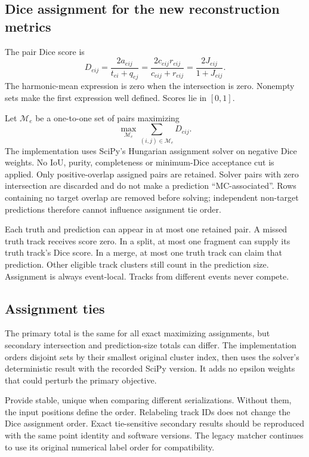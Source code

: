 \documentclass[11pt,letterpaper]{article}
\newcommand{\code}[1]{\texttt{\detokenize{#1}}}
\begin{document}
\subsection{Dice assignment for the new reconstruction metrics}

The pair Dice score is
\begin{equation}
 D_{eij}=\frac{2a_{eij}}{t_{ei}+q_{ej}}
        =\frac{2c_{eij}r_{eij}}{c_{eij}+r_{eij}}
        =\frac{2J_{eij}}{1+J_{eij}}.
\end{equation}
The harmonic-mean expression is zero when the intersection is zero. Nonempty
sets make the first expression well defined. Scores lie in $[0,1]$.

Let $\mathcal M_e$ be a one-to-one set of pairs maximizing
\begin{equation}
 \max_{\mathcal M_e}\sum_{(i,j)\in\mathcal M_e}D_{eij}.
\end{equation}
The implementation uses SciPy's Hungarian assignment solver on negative Dice
weights. No IoU, purity, completeness or minimum-Dice acceptance cut is applied.
Only positive-overlap assigned pairs are retained. Solver pairs with zero
intersection are discarded and do not make a prediction ``MC-associated''.
Rows containing no target overlap are removed before solving; independent
non-target predictions therefore cannot influence assignment tie order.

Each truth and prediction can appear in at most one retained pair. A missed
truth track receives score zero. In a split, at most one fragment can supply its
truth track's Dice score. In a merge, at most one truth track can claim that
prediction. Other eligible track clusters still count in the prediction size.
Assignment is always event-local. Tracks from different events never compete.

\subsection{Assignment ties}

The primary total is the same for all exact maximizing assignments, but secondary
intersection and prediction-size totals can differ. The implementation orders
disjoint sets by their smallest original cluster index, then uses the solver's
deterministic result with the recorded SciPy version. It adds no epsilon weights
that could perturb the primary objective.

Provide stable, unique \code{point_ids} when comparing different serializations.
Without them, the input positions define the order. Relabeling track IDs does not
change the Dice assignment order. Exact tie-sensitive secondary results should
be reproduced with the same point identity and software versions. The legacy
matcher continues to use its original numerical label order for compatibility.
\end{document}
